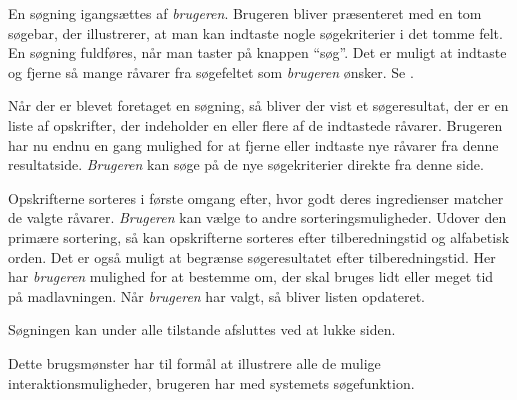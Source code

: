 {En søgning igangsættes af \textit{brugeren}. Brugeren bliver præsenteret med en tom søgebar, der illustrerer, at man kan indtaste nogle søgekriterier i det tomme felt. En søgning fuldføres, når man taster på knappen ``søg''. Det er muligt at indtaste og fjerne så mange råvarer fra søgefeltet som \textit{brugeren} ønsker. Se .

Når der er blevet foretaget en søgning, så bliver der vist et søgeresultat, der er en liste af opskrifter, der indeholder en eller flere af de indtastede råvarer. Brugeren har nu endnu en gang mulighed for at fjerne eller indtaste nye råvarer fra denne resultatside. \textit{Brugeren} kan søge på de nye søgekriterier direkte fra denne side.

Opskrifterne sorteres i første omgang efter, hvor godt deres ingredienser matcher de valgte råvarer. \textit{Brugeren} kan vælge to andre sorteringsmuligheder. Udover den primære sortering, så kan opskrifterne sorteres efter tilberedningstid og alfabetisk orden. Det er også muligt at begrænse søgeresultatet efter tilberedningstid. Her har \textit{brugeren} mulighed for at bestemme om, der skal bruges lidt eller meget tid på madlavningen. Når \textit{brugeren} har valgt, så bliver listen opdateret.

Søgningen kan under alle tilstande afsluttes ved at lukke siden.}
{}
{}
{Dette brugsmønster har til formål at illustrere alle de mulige interaktionsmuligheder, brugeren har med systemets søgefunktion.}